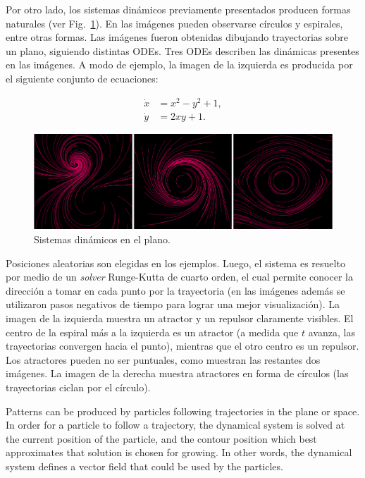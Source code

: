 \documentclass[oneside,a4paper,spanish,links]{amca}
\begin{document}
Por otro lado, los sistemas din\'amicos previamente presentados producen formas naturales (ver Fig.~\ref{fg:fig3}). En las im\'agenes pueden observarse c\'irculos y espirales, entre otras formas. Las im\'agenes fueron obtenidas dibujando trayectorias sobre un plano, siguiendo distintas ODEs. Tres ODEs describen las din\'amicas presentes en las im\'agenes. A modo de ejemplo, la imagen de la izquierda es producida por el siguiente conjunto de ecuaciones:

\begin{equation} \label{eq:simple}  
  \begin{aligned}
    \dot{x} &= x^{2}-y^{2}+1,\\
    \dot{y} &= 2xy+1.
  \end{aligned}
\end{equation}


\begin{figure}[htb!]
  \centerline{\includegraphics[scale=0.28]{fig3}}
  \caption{Sistemas din\'amicos en el plano.}
  \label{fg:fig3}
\end{figure}

Posiciones aleatorias son elegidas en los ejemplos. Luego, el sistema es resuelto por medio de un {\em solver} Runge-Kutta de cuarto orden, el cual permite conocer la direcci\'on a tomar en cada punto por la trayectoria (en las im\'agenes adem\'as se utilizaron pasos negativos de tiempo para lograr una mejor visualizaci\'on). La imagen de la izquierda muestra un atractor y un repulsor claramente visibles. El centro de la espiral m\'as a la izquierda es un atractor (a medida que $t$ avanza, las trayectorias convergen hacia el punto), mientras que el otro centro es un repulsor. Los atractores pueden no ser puntuales, como muestran las restantes dos im\'agenes. La imagen de la derecha muestra atractores en forma de c\'irculos (las trayectorias ciclan por el c\'irculo).

Patterns can be produced by particles following trajectories in the plane or space. In order for a particle to follow a trajectory, the dynamical system is solved at the current position of the particle, and the contour position which best approximates that solution is chosen for growing. In other words, the dynamical system defines a vector field that could be used by the particles.
\end{document}
